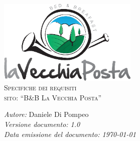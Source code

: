 \documentclass[a4paper,12pt,hidelinks]{report}
\begin{document}
\begin{titlepage}
  \begin{center}
    \includegraphics[width=0.5\textwidth,keepaspectratio=true]{../img/logo}\\[1cm]    
    \textsc{\LARGE Specifiche dei requisiti}\\[0.6cm]
    \textsc{\LARGE  sito: ``B\&B La Vecchia Posta''}\\ [2.0cm]

    \begin{minipage}{0.8\textwidth}
      \begin{flushleft} \large
	\emph{Autore:} Daniele Di Pompeo \\[0.5cm]
	\emph{Versione documento: 1.0}\\[0.5cm]
	\emph{Data emissione del documento: \today}\\[0.5cm]
      \end{flushleft}
    \end{minipage}
  \end{center}
\end{titlepage}

\tableofcontents
\end{document}
